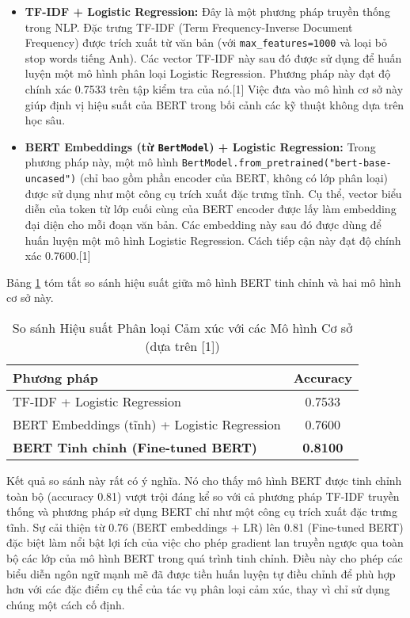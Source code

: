 \begin{itemize}
    \item \textbf{TF-IDF + Logistic Regression:} Đây là một phương pháp truyền thống trong NLP. Đặc trưng TF-IDF (Term Frequency-Inverse Document Frequency) được trích xuất từ văn bản (với \texttt{max\_features=1000} và loại bỏ stop words tiếng Anh). Các vector TF-IDF này sau đó được sử dụng để huấn luyện một mô hình phân loại Logistic Regression. Phương pháp này đạt độ chính xác 0.7533 trên tập kiểm tra của nó.[1] Việc đưa vào mô hình cơ sở này giúp định vị hiệu suất của BERT trong bối cảnh các kỹ thuật không dựa trên học sâu.

    \item \textbf{BERT Embeddings (từ \texttt{BertModel}) + Logistic Regression:} Trong phương pháp này, một mô hình \texttt{BertModel.from\_pretrained("bert-base-uncased")} (chỉ bao gồm phần encoder của BERT, không có lớp phân loại) được sử dụng như một công cụ trích xuất đặc trưng tĩnh. Cụ thể, vector biểu diễn của token \texttt{} từ lớp cuối cùng của BERT encoder được lấy làm embedding đại diện cho mỗi đoạn văn bản. Các embedding này sau đó được dùng để huấn luyện một mô hình Logistic Regression. Cách tiếp cận này đạt độ chính xác 0.7600.[1]
\end{itemize}
Bảng \ref{tab:comparison_baseline_models_rewrite} tóm tắt so sánh hiệu suất giữa mô hình BERT tinh chỉnh và hai mô hình cơ sở này.

\begin{table}[H]
    \centering
    \caption{So sánh Hiệu suất Phân loại Cảm xúc với các Mô hình Cơ sở (dựa trên [1])}
    \label{tab:comparison_baseline_models_rewrite}
    \begin{tabular}{lc}
        \toprule
        \textbf{Phương pháp} & \textbf{Accuracy} \\
        \midrule
        TF-IDF + Logistic Regression & 0.7533 \\
        BERT Embeddings (tĩnh) + Logistic Regression & 0.7600 \\
        \textbf{BERT Tinh chỉnh (Fine-tuned BERT)} & \textbf{0.8100} \\
        \bottomrule
    \end{tabular}
\end{table}
Kết quả so sánh này rất có ý nghĩa. Nó cho thấy mô hình BERT được tinh chỉnh toàn bộ (accuracy 0.81) vượt trội đáng kể so với cả phương pháp TF-IDF truyền thống và phương pháp sử dụng BERT chỉ như một công cụ trích xuất đặc trưng tĩnh. Sự cải thiện từ 0.76 (BERT embeddings + LR) lên 0.81 (Fine-tuned BERT) đặc biệt làm nổi bật lợi ích của việc cho phép gradient lan truyền ngược qua toàn bộ các lớp của mô hình BERT trong quá trình tinh chỉnh. Điều này cho phép các biểu diễn ngôn ngữ mạnh mẽ đã được tiền huấn luyện tự điều chỉnh để phù hợp hơn với các đặc điểm cụ thể của tác vụ phân loại cảm xúc, thay vì chỉ sử dụng chúng một cách cố định.

